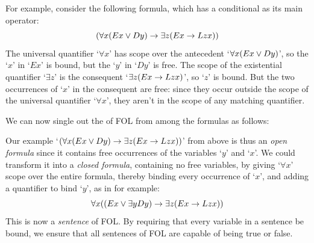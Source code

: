 For example, consider the following formula, which has a conditional as its main operator:
	$$(\forall x(Ex \vee Dy) \rightarrow \exists z(Ex \rightarrow Lzx))$$
The universal quantifier `$\forall x$' has scope over the antecedent `$\forall x (Ex \vee Dy)$', so the `$x$' in `$Ex$' is bound, but the `$y$' in `$Dy$' is free. The scope of the existential quantifier `$\exists z$' is the consequent `$\exists z(Ex \rightarrow Lzx)$', so `$z$' is bound.  But the two occurrences of `$x$' in the consequent are free: since they occur outside the scope of the universal quantifier `$\forall x$', they aren't in the scope of any matching quantifier.  

We can now single out the  of FOL from among the formulas as follows:


Our example `$(\forall x(Ex \vee Dy) \rightarrow \exists z(Ex \rightarrow Lzx))$' from above is thus an \emph{open formula} since it contains free occurrences of the variables `$y$' and  `$x$'.  We could transform it into a \emph{closed formula}, containing no free variables, by giving `$\forall x$' scope over the entire formula, thereby binding every occurrence of `$x$', and adding a quantifier to bind `$y$', as in for example:
$$\forall x((Ex \vee \exists yDy) \rightarrow \exists z(Ex \rightarrow Lzx))$$
This is now a \emph{sentence} of FOL.   By requiring that every variable in a sentence be bound, we ensure that all sentences of FOL are capable of being true or false.

